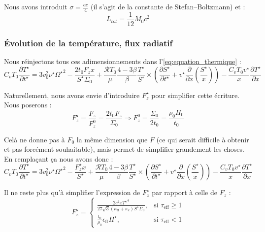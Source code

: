 Nous avons introduit $\sigma = \frac{a c}{4}$ (il s’agit de la constante de
Stefan–Boltzmann) et :
\begin{equation}
    L_{tot} = \frac{1}{12} \dot{M_0} c^2
\end{equation}

\subsubsection{Évolution de la température, flux radiatif}

Nous réinjectons tous ces adimensionnements dans l’\cref{eq:equation_thermique} :
\begin{equation}
    C_v T_0 \frac{\partial T^{\star}}{\partial t^{\star}} =
    3 v_0^2 \nu^\star {\Omega^\star}^2 - \frac{2 t_0 F_z x}{S^\star \Sigma_0} +
    \frac{\mathcal{R} T_0}{\mu} \frac{4-3\beta}{\beta} \frac{T^\star}{S^\star} \times
    \left( \frac{\partial S^\star}{\partial t^\star} + v^\star \frac{\partial}{\partial x} \left(\frac{S^\star}{x}\right) \right) -
    \frac{C_v T_0 v^\star}{x} \frac{\partial T^\star}{\partial x}
\end{equation}

Naturellement, nous avons envie d’introduire $F_z^\star$ pour simplifier cette
écriture. Nous poserons :
\begin{equation}
    F_z^\star = \frac{F_z}{F_z^0} = \frac{2 t_0 F_z}{\Sigma_0} \Rightarrow F_z^0 = \frac{\Sigma_0}{2 t_0} = \frac{\rho_0 H_0}{t_0}
\end{equation}

Celà ne donne pas à $F_0$ la même dimension que $F$ (ce qui serait difficile à
obtenir et pas forcément souhaitable), mais permet de simplifier grandement les
choses. En remplaçant ça nous avons donc :
\begin{equation}
    C_v T_0 \frac{\partial T^{\star}}{\partial t^{\star}} =
    3 v_0^2 \nu^\star {\Omega^\star}^2 - \frac{F_z^\star x}{S^\star} +
    \frac{\mathcal{R} T_0}{\mu} \frac{4-3\beta}{\beta} \frac{T^\star}{S^\star} \times
    \left( \frac{\partial S^\star}{\partial t^\star} + v^\star \frac{\partial}{\partial x} \left(\frac{S^\star}{x}\right) \right) -
    \frac{C_v T_0 v^\star}{x} \frac{\partial T^\star}{\partial x}
\end{equation}

Il ne reste plus qu’à simplifier l’expression de $F_z^\star$ par rapport à
celle de $F_z$ :
\begin{equation}
    F_z^\star =
    \begin{cases}
        \frac{2 c^2 x {T^\star}^4}{27 \sqrt{3} (\kappa_\mathrm{ff} + \kappa_e) S^\star \Sigma_0}, &\text{si $\tau_\mathrm{eff} \geq 1$} \\
        \frac{t_0}{\rho_0}\epsilon_\mathrm{ff} H^\star, &\text{si $\tau_\mathrm{eff} < 1$}
    \end{cases}
\end{equation}

